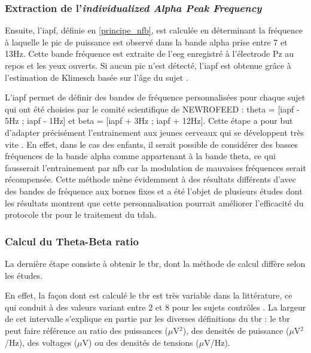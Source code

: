\subsubsection{Extraction de l'\textit{individualized Alpha Peak Frequency}} \label{extraction_iapf}
Ensuite, l'\gls{iapf}, définie en \ref{principe_nfb}, est calculée en déterminant la fréquence à laquelle le pic de puissance est observé dans la bande alpha prise entre 7 et 13Hz.
Cette bande fréquence est extraite de l'\gls{eeg} enregistré à l'électrode Pz au repos et les yeux ouverts. 
Si aucun pic n'est détecté, l'\gls{iapf} est obtenue grâce à l'estimation de Klimesch basée sur l'âge du sujet \citep{Klimesch1999}. 

L'\gls{iapf} permet de définir des bandes de fréquence personnalisées pour chaque sujet qui ont été choisies 
par le comité scientifique de NEWROFEED : theta = [\gls{iapf} - 5Hz ; \gls{iapf} - 1Hz] et beta = [\gls{iapf} + 3Hz ; \gls{iapf} + 12Hz].
Cette étape a pour but d'adapter précisément l'entrainement aux jeunes cerveaux qui se développent très vite \citep{Aurlien2004}. En effet, dans le cas des enfants, il serait possible de considérer 
des basses fréquences de la bande alpha comme appartenant à la bande theta, ce qui fausserait l'entrainement par \gls{nfb} car la modulation de mauvaises fréquences 
serait récompensée. Cette méthode mène évidemment à des résultats différents d'avec des bandes de fréquence aux bornes fixes \citep{Arns2008, Vollebregt2015} et a été 
l'objet de plusieurs études \citep{Kaiser2001, Bazanova2006, Vollebregt2015} dont les résultats montrent que cette personnalisation pourrait améliorer l'efficacité du protocole
\gls{tbr} pour le traitement du \gls{tdah}.

\subsubsection{Calcul du Theta-Beta ratio} \label{tbr_computation}
La dernière étape consiste à obtenir le \gls{tbr}, dont la méthode de calcul diffère selon les études.

En effet, la façon dont est calculé le \gls{tbr} est très variable dans la littérature, ce qui conduit à des valeurs variant entre 2 et 8 pour les sujets contrôles \citep{Arns2012,
Schutte2017}. La largeur de cet intervalle s'explique en partie par les diverses définitions du \gls{tbr} : le \gls{tbr} peut faire référence au ratio
des puissances ($\mu$V$^2$), des densités de puissance ($\mu$V$^2$/Hz), des voltages ($\mu$V) ou des densités de tensions ($\mu$V/Hz).  

